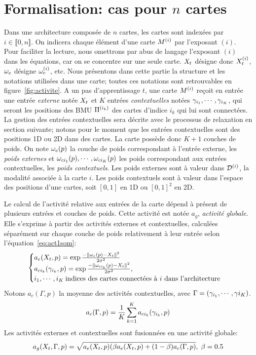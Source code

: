 \section{Formalisation: cas pour $n$ cartes}

Dans une architecture composée de $n$ cartes, les cartes sont indexées par $i \in \llbracket 0,n \rrbracket$. On indicera chaque élément d'une carte $M^{({i})}$ par l'exposant $(i)$. Pour faciliter la lecture, nous omettrons par abus de langage l'exposant $(i)$ dans les équations, car on se concentre sur une seule carte. $X_t$ désigne donc $X_t^{({i})}$, $\omega_e$ désigne $\omega_e^{({i})}$, etc.
Nous présentons dans cette partie la structure et les notations utilisées dans une carte; toutes ces notations sont retrouvables en figure~\ref{fig:activite}.
A un pas d'apprentissage $t$, une carte $M^{({i})}$ reçoit en entrée une entrée \emph{externe} notée $X_t$ et $K$ entrées \emph{contextuelles} notées $\gamma_{i_1},\cdots,\gamma_{i_K}$, qui seront les positions des BMU $\Pi^{({i_k})}$ des cartes d'indice $i_k$ qui lui sont connectées. La gestion des entrées contextuelles sera décrite avec le processus de relaxation en section suivante; notons pour le moment que les entrées contextuelles sont des positions 1D ou 2D dans des cartes. 
La carte possède donc $K+1$ couches de poids. On  note $\omega_e(p)$ la couche de poids correspondant à l'entrée externe, les \emph{poids externes} et $\omega_{ci_1}(p), \cdots, \omega_{ci_K}(p)$ les poids correspondant aux entrées contextuelles, les \emph{poids contextuels}. Les poids externes sont à valeur dans $\mathcal{D}^{({i})}$, la modalité associée à la carte $i$. Les poids contextuels sont à valeur dans l'espace des positions d'une cartes, soit $[0,1]$ en 1D ou $[0,1]^2$ en 2D.

Le calcul de l'activité relative aux entrées de la carte dépend à présent de plusieurs entrées et couches de poids. Cette activité est notée $a_g$, \emph{activité globale}.
Elle s'exprime à partir des activités externes et contextuelles, calculées séparément sur chaque couche de poids relativement à leur entrée selon l'équation~\ref{eq:act1som}:
\begin{equation}
\label{eq:activite}
\begin{cases}
a_e(X_t,p) = \exp\frac{-\lVert \omega_e(p)-X_t \rVert^2}{2\sigma^2} \\
a_{ci_k}(\gamma_{i_k},p) = \exp\frac{-\lVert \omega_{ci_k}(p)-X_t \rVert ^2}{2\sigma^2}, \\
i_1, \cdots, i_K\: \text{indices des cartes connectées à $i$ dans l'architecture}
\end{cases}
\end{equation}
Notons $a_c(\Gamma,p)$ la moyenne des activités contextuelles, avec $\Gamma = (\gamma_{i_1}, \cdots, \gamma{i_K})$.
\begin{equation}
a_c(\Gamma,p) = \frac{1}{K}\sum_{k=1}^K {a_{ci_k}(\gamma_{i_k},p)}
\end{equation}
Les activités externes et contextuelles sont fusionnées en une activité globale:
\begin{equation}
\label{eq:global_act}
a_g(X_t,\Gamma,p) = \sqrt{a_e(X_t,p)(\beta a_e(X_t,p) + (1-\beta) a_c(\Gamma,p)}, \; \beta=0.5
\end{equation} 

